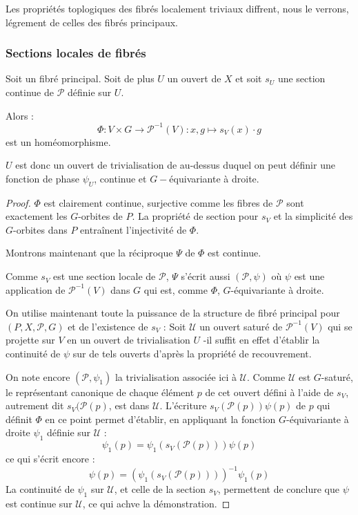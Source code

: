 Les propri\'et\'es toplogiques des fibr\'es localement triviaux diffrent, nous le verrons, l\'egrement de celles des fibr\'es principaux.


\subsubsection{Sections locales de fibr\'es}

\begin{prop}\label{stV1}
Soit \Fig un fibr\'e principal. Soit de plus $U$ un ouvert de $X$ et soit $s_U$ une section continue de $\mathcal{P}$ d\'efinie sur $U$.
\par
Alors :
\[\Phi:V\times G\rightarrow\mathcal{P}^{-1}(V):x,g\mapsto s_V(x)\cdot g\]
est un hom\'eomorphisme.
\par$U$ est donc un ouvert de trivialisation de \Fig au-dessus duquel on peut d\'efinir une fonction de phase $\psi_U$, continue et $G-$\'equivariante \`a droite.
\end{prop}

\begin{proof}
$\Phi$ est clairement continue, surjective comme les fibres de $\mathcal{P}$ sont exactement les $G$-orbites de $P$. %
La propriété de section pour $s_V$ et la simplicité des $G$-orbites dans $P$ entraînent l'injectivité de $\Phi$.
\par
Montrons maintenant que la r\'eciproque $\Psi$ de $\Phi$ est continue.
\par
Comme $s_V$ est une section locale de $\mathcal{P}$, $\Psi$ s'écrit aussi $(\mathcal{P},\psi)$ %
o\`u $\psi$ est une application de $\mathcal{P}^{-1}(V)$ dans $G$ qui est, comme $\Phi$, $G$-équivariante à droite.
\par
On utilise maintenant toute la puissance de la structure de fibr\'e principal pour $(P,X,\mathcal{P},G)$ et de l'existence de $s_V$ :
Soit $\mathcal{U}$ un ouvert saturé de $\mathcal{P}^{-1}(V)$ qui se projette sur $V$ en un ouvert de trivialisation $U$ %
-il suffit en effet d'établir la continuité de $\psi$ sur de tels ouverts d'après la propriété de recouvrement.
\par
On note encore $(\mathcal{P},\psi_1)$ la trivialisation associée ici à $\mathcal{U}$. %
Comme $\mathcal{U}$ est $G$-saturé, le représentant canonique de chaque élément $p$ de cet ouvert défini à l'aide de $s_V$, %
autrement dit $s_V(\mathcal{P}(p)$, est dans $\mathcal{U}$. %
L'écriture $s_V(\mathcal{P}(p)) \psi(p)$ de $p$ qui définit $\Phi$ en ce point permet d'établir, %
en appliquant la fonction $G$-équivariante à droite $\psi_1$ définie sur $\mathcal{U}$ :
\[\psi_1(p) = \psi_1(s_V(\mathcal{P}(p)))\psi(p)\]
ce qui s'écrit encore :
\[\psi(p) = (\psi_1(s_V(\mathcal{P}(p))))^{-1} \psi_1(p)\]
La continuité de $\psi_1$ sur $\mathcal{U}$, et celle de la section $s_V$, permettent de conclure que $\psi$ est continue sur $\mathcal{U}$, ce qui achve la démonstration.
\end{proof}

